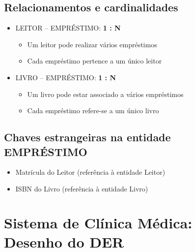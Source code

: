 \documentclass[12pt,a4paper]{article}
\begin{document}
\subsection{Relacionamentos e cardinalidades}

\begin{itemize}
\item LEITOR -- EMPRÉSTIMO: \textbf{1 : N}
\begin{itemize}
\item Um leitor pode realizar vários empréstimos
\item Cada empréstimo pertence a um único leitor
\end{itemize}

\item LIVRO -- EMPRÉSTIMO: \textbf{1 : N}
\begin{itemize}
\item Um livro pode estar associado a vários empréstimos
\item Cada empréstimo refere-se a um único livro
\end{itemize}
\end{itemize}

\subsection{Chaves estrangeiras na entidade EMPRÉSTIMO}

\begin{itemize}
\item Matrícula do Leitor (referência à entidade Leitor)
\item ISBN do Livro (referência à entidade Livro)
\end{itemize}

\section{Sistema de Clínica Médica: Desenho do DER}
\end{document}
